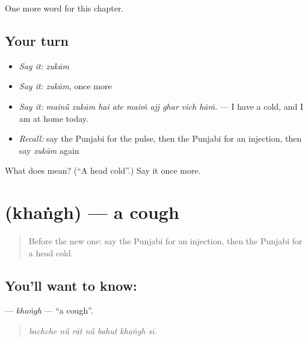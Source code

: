 \begin{grammarlens}[title={What you've built}]
One more word for this chapter.
\end{grammarlens}

\subsection*{Your turn}
\begin{itemize}
\raggedright
  \item \emph{Say it:} \emph{zukām}
  \item \emph{Say it:} \emph{zukām}, once more
  \item \emph{Say it:} \emph{mainū̃ zukām hai ate maiṁ ajj ghar vich hāṁ.} — I have a cold, and I am at home today.
  \item \emph{Recall:} say the Punjabi for the pulse, then the Punjabi for an injection, then say \emph{zukām} again
\end{itemize}

\begin{tcolorbox}[breakable,colback=teal!4,colframe=teal!35!black,title={Before you move on}]
What does  mean? (\textquotedblleft{}A head cold\textquotedblright{}.) Say it once more.
\end{tcolorbox}
\section[\texorpdfstring{\pa{ਖੰਘ} (khaṅgh)}{ਖੰਘ (khaṅgh)}]{ (khaṅgh) — a cough}

\label{lesson:PA-C321-khangh}



\begin{quote}
Before the new one: say the Punjabi for an injection, then the Punjabi for a head cold.
\end{quote}

\subsection*{You'll want to know: }
\textbf{} — \emph{khaṅgh} — \textquotedblleft{}a cough\textquotedblright{}.

\begin{quote}
      
\end{quote}

\begin{quote}
\emph{bachche nū̃ rāt nū̃ bahut khaṅgh sī.}
\end{quote}

